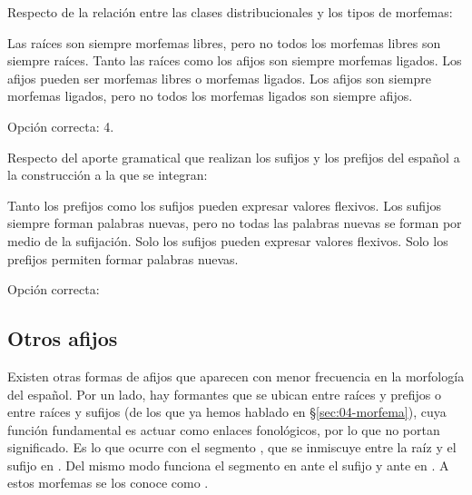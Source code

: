 \begin{ejercicio}
\begin{consignas}
  \item Respecto de la relación entre las clases distribucionales y los tipos de
        morfemas:
        \begin{exe}
          \ex Las raíces son siempre morfemas libres, pero no todos los
              morfemas libres son siempre raíces.
          \ex Tanto las raíces como los afijos son siempre morfemas ligados.
          \ex Los afijos pueden ser morfemas libres o morfemas ligados.
          \ex Los afijos son siempre morfemas ligados, pero no todos los
              morfemas ligados son siempre afijos.
        \end{exe}
        \begin{resuelto}
        Opción correcta: 4.
        \end{resuelto}
  \item Respecto del aporte gramatical que realizan los sufijos y los prefijos
        del español a la construcción a la que se integran:
        \begin{exe}
          \ex Tanto los prefijos como los sufijos pueden expresar valores
              flexivos.
          \ex Los sufijos siempre forman palabras nuevas, pero no todas las
              palabras nuevas se forman por medio de la sufijación.
          \ex Solo los sufijos pueden expresar valores flexivos.
          \ex Solo los prefijos permiten formar palabras nuevas.
        \end{exe}
        Opción correcta:\completar[1]
\end{consignas}
\end{ejercicio}

\subsection{Otros afijos}

Existen otras formas de afijos que aparecen con menor frecuencia en la
morfología del español. Por un lado, hay formantes que se ubican entre raíces y
prefijos o entre raíces y sufijos (de los que ya hemos hablado en
§\ref{sec:04-morfema}), cuya función fundamental es actuar como enlaces
fonológicos, por lo que no portan significado. Es lo que ocurre con el segmento
, que se inmiscuye entre la raíz  y el sufijo
 en . Del mismo modo funciona el segmento
 en  ante el sufijo  y ante
 en . A estos morfemas se los conoce como
.

